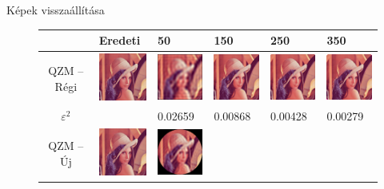 \documentclass{beamer}
\begin{document}
\begin{frame}{Képek visszaállítása}
    \vskip 5mm
    \begin{adjustwidth}{-1.5em}{0em}
    \bigskip
    \begin{footnotesize}
    \begin{figure}
        \centering
    \begin{tabular}{c | q q q q q }
     & Eredeti & 50 & 150 & 250 & 350 \\ \hline\hline
    QZM -- Régi & 
    \includegraphics[width=50pt]{figures/reconstruction/lo256.png} &
    \includegraphics[width=50pt]{figures/reconstruction/lo25650.png} &
    \includegraphics[width=50pt]{figures/reconstruction/lo256150.png} &
    \includegraphics[width=50pt]{figures/reconstruction/lo256250.png} &
    \includegraphics[width=50pt]{figures/reconstruction/lo256350.png} \\
    $\varepsilon^2$ & & 0.02659 & 0.00868 & 0.00428 & 0.00279 \\
    QZM -- Új& 
    \includegraphics[width=50pt]{figures/reconstruction/lo256.png} &
    \includegraphics[width=50pt]{figures/reconstruction/ln25650.png} &

\end{tabular}
\end{figure}
\end{footnotesize}
\end{adjustwidth}
\end{frame}
\end{document}
